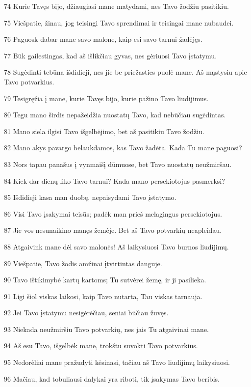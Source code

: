 \par 74 Kurie Tavęs bijo, džiaugiasi mane matydami, nes Tavo žodžiu pasitikiu. 
\par 75 Viešpatie, žinau, jog teisingi Tavo sprendimai ir teisingai mane nubaudei. 
\par 76 Paguosk dabar mane savo malone, kaip esi savo tarnui žadėjęs. 
\par 77 Būk gailestingas, kad aš išlikčiau gyvas, nes gėriuosi Tavo įstatymu. 
\par 78 Sugėdinti tebūna išdidieji, nes jie be priežasties puolė mane. Aš mąstysiu apie Tavo potvarkius. 
\par 79 Tesigręžia į mane, kurie Tavęs bijo, kurie pažino Tavo liudijimus. 
\par 80 Tegu mano širdis nepažeidžia nuostatų Tavo, kad nebūčiau sugėdintas. 
\par 81 Mano siela ilgisi Tavo išgelbėjimo, bet aš pasitikiu Tavo žodžiu. 
\par 82 Mano akys pavargo belaukdamos, kas Tavo žadėta. Kada Tu mane paguosi? 
\par 83 Nors tapau panašus į vynmaišį dūmuose, bet Tavo nuostatų neužmiršau. 
\par 84 Kiek dar dienų liko Tavo tarnui? Kada mano persekiotojus pasmerksi? 
\par 85 Išdidieji kasa man duobę, nepaisydami Tavo įstatymo. 
\par 86 Visi Tavo įsakymai teisūs; padėk man prieš melagingus persekiotojus. 
\par 87 Jie vos nesunaikino manęs žemėje. Bet aš Tavo potvarkių neapleidau. 
\par 88 Atgaivink mane dėl savo malonės! Aš laikysiuosi Tavo burnos liudijimų. 
\par 89 Viešpatie, Tavo žodis amžinai įtvirtintas danguje. 
\par 90 Tavo ištikimybė kartų kartoms; Tu sutvėrei žemę, ir ji pasilieka. 
\par 91 Ligi šiol viskas laikosi, kaip Tavo nutarta, Tau viskas tarnauja. 
\par 92 Jei Tavo įstatymu nesigėrėčiau, seniai būčiau žuvęs. 
\par 93 Niekada neužmiršiu Tavo potvarkių, nes jais Tu atgaivinai mane. 
\par 94 Aš esu Tavo, išgelbėk mane, trokštu suvokti Tavo potvarkius. 
\par 95 Nedorėliai mane pražudyti kėsinasi, tačiau aš Tavo liudijimų laikysiuosi. 
\par 96 Mačiau, kad tobuliausi dalykai yra riboti, tik įsakymas Tavo beribis. 
